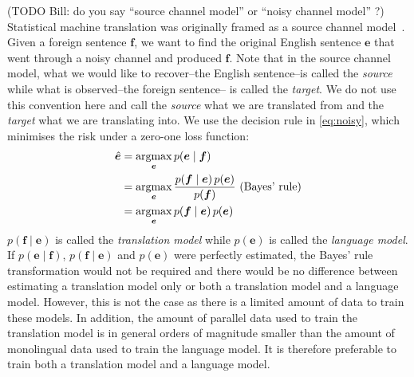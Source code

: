 
(TODO Bill: do you say ``source channel model'' or ``noisy channel model'' ?)
Statistical machine translation was originally framed as a source channel
model~\citep{shannon:1948:BellSystemTechnicalJournal,brown-cocke-dellapietra-dellapietra-jelinek-lafferty-mercer-roossin:1990:CL,brown-dellapietra-dellapietra-mercer-1993}.
Given a
foreign sentence $\bm{f}$, we want to find the original English sentence
$\bm{e}$ that went through a noisy channel and produced $\bm{f}$. Note that in
the source channel model, what we would like to recover--the English sentence--is
called the \emph{source} while what is observed--the foreign sentence-- is
called the \emph{target}. We do not use this convention here and call the
\emph{source} what we are translated from and the \emph{target} what we are
translating into. We use the
decision rule in \autoref{eq:noisy}, which minimises the risk under a zero-one
loss function:
%
\begin{align}
  \hat{\bm{e}} &= \operatorname*{argmax}_{\bm{e}} p(\bm{e} \mid \bm{f}) \nonumber \\
                &= \operatorname*{argmax}_{\bm{e}} \frac{p(\bm{f} \mid \bm{e}) \, p(\bm{e})}{p(\bm{f})} \mbox{ (Bayes' rule)} \nonumber \\
                &= \operatorname*{argmax}_{\bm{e}} p(\bm{f} \mid \bm{e}) \, p(\bm{e}) \label{eq:noisy}
\end{align}
%
$p(\bm{f} \mid \bm{e})$ is called the \emph{translation model} while
$p(\bm{e})$ is called the \emph{language model}. If $p(\bm{e} \mid \bm{f})$,
$p(\bm{f} \mid \bm{e})$ and $p(\bm{e})$ were perfectly estimated, the Bayes'
rule transformation would not be required and there would be no difference
between estimating a translation model only or both a
translation model and a language model. However, this is not the case as there
is a limited amount of data to train these models. In addition, the amount of
parallel data used to train the translation model is in general orders of
magnitude smaller than the
amount of monolingual data used to train the language model. It is therefore
preferable to train both a translation model and a language model.

